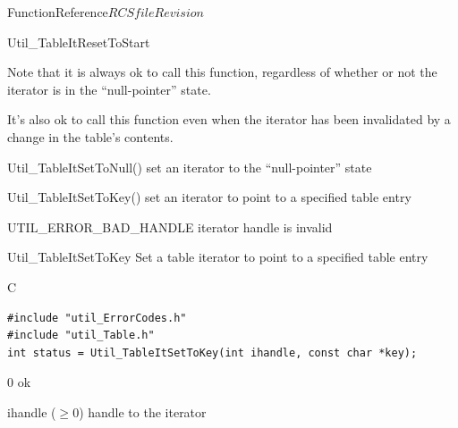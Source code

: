 \begin{cactuspart}{FunctionReference}{$RCSfile$}{$Revision$}
\begin{FunctionDescription}{Util\_TableItResetToStart}
\begin{Discussion}
Note that it is always ok to call this function, regardless of
whether or not the iterator is in the ``null-pointer'' state.

It's also ok to call this function even when the iterator has been
invalidated by a change in the table's contents.
\end{Discussion}

\begin{SeeAlsoSection}
\begin{SeeAlso}{Util\_TableItSetToNull()}
set an iterator to the ``null-pointer'' state
\end{SeeAlso}
\begin{SeeAlso}{Util\_TableItSetToKey()}
set an iterator to point to a specified table entry
\end{SeeAlso}
\end{SeeAlsoSection}

\begin{ErrorSection}
\begin{Error}{UTIL\_ERROR\_BAD\_HANDLE}
iterator handle is invalid
\end{Error}
\end{ErrorSection}
\end{FunctionDescription}


\begin{FunctionDescription}{Util\_TableItSetToKey}
\label{Util-TableItSetToKey}
Set a table iterator to point to a specified table entry

\begin{SynopsisSection}
\begin{Synopsis}{C}
\begin{verbatim}
#include "util_ErrorCodes.h"
#include "util_Table.h"
int status = Util_TableItSetToKey(int ihandle, const char *key);
\end{verbatim}
\end{Synopsis}
\end{SynopsisSection}

\begin{ResultSection}
\begin{Result}{\rm 0}
ok
\end{Result}
\end{ResultSection}

\begin{ParameterSection}
\begin{Parameter}{ihandle ($\ge 0$)}
handle to the iterator
\end{Parameter}
\end{ParameterSection}


\end{FunctionDescription}
\end{cactuspart}
